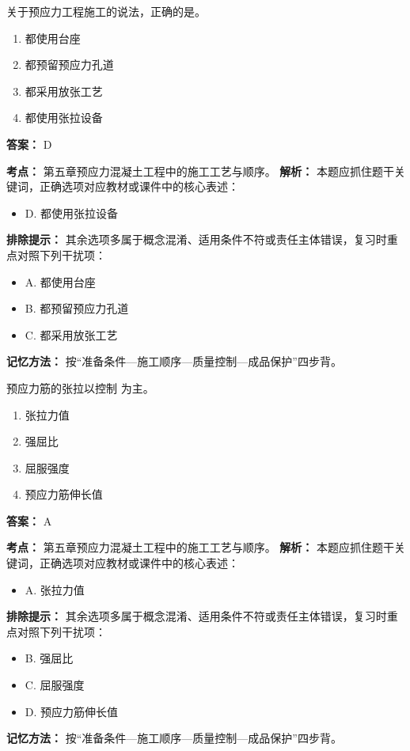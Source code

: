 \documentclass[UTF8,fontset=fandol,11pt]{ctexart}
\begin{document}
\begin{quizbox}[title={第 3 题}]
关于预应力工程施工的说法，正确的是。\\
\begin{enumerate}[label=\Alph*.]
\item 都使用台座
\item 都预留预应力孔道
\item 都采用放张工艺
\item 都使用张拉设备
\end{enumerate}
\textbf{答案：} D
\vspace{0.25em}
\begin{answerbox}[title={考点解析}]
\textbf{考点：} 第五章预应力混凝土工程中的施工工艺与顺序。
\textbf{解析：} 本题应抓住题干关键词，正确选项对应教材或课件中的核心表述：
\begin{itemize}
\item D. 都使用张拉设备
\end{itemize}
\textbf{排除提示：} 其余选项多属于概念混淆、适用条件不符或责任主体错误，复习时重点对照下列干扰项：
\begin{itemize}
\item A. 都使用台座
\item B. 都预留预应力孔道
\item C. 都采用放张工艺
\end{itemize}
\textbf{记忆方法：} 按“准备条件—施工顺序—质量控制—成品保护”四步背。
\end{answerbox}
\end{quizbox}

\begin{quizbox}[title={第 4 题}]
预应力筋的张拉以控制 为主。\\
\begin{enumerate}[label=\Alph*.]
\item 张拉力值
\item 强屈比
\item 屈服强度
\item 预应力筋伸长值
\end{enumerate}
\textbf{答案：} A
\vspace{0.25em}
\begin{answerbox}[title={考点解析}]
\textbf{考点：} 第五章预应力混凝土工程中的施工工艺与顺序。
\textbf{解析：} 本题应抓住题干关键词，正确选项对应教材或课件中的核心表述：
\begin{itemize}
\item A. 张拉力值
\end{itemize}
\textbf{排除提示：} 其余选项多属于概念混淆、适用条件不符或责任主体错误，复习时重点对照下列干扰项：
\begin{itemize}
\item B. 强屈比
\item C. 屈服强度
\item D. 预应力筋伸长值
\end{itemize}
\textbf{记忆方法：} 按“准备条件—施工顺序—质量控制—成品保护”四步背。
\end{answerbox}
\end{quizbox}
\end{document}
